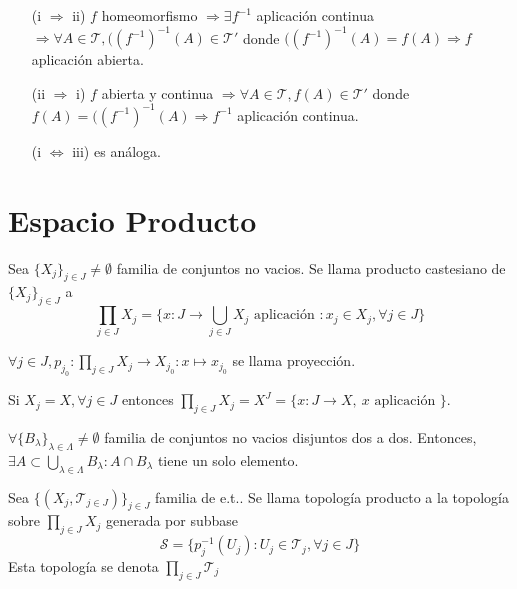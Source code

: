 \begin{dem}
  \begin{enumerate}[label=(\roman*)]
    \item []
    \item [(i $\Rightarrow$ ii)] $f$ homeomorfismo $\Rightarrow \exists f^{-1}$ aplicación continua $\Rightarrow \forall A \in \mathcal{T}, ((f^{-1})^{-1}(A) \in \mathcal{T}'$ donde $((f^{-1})^{-1}(A) = f(A) \Rightarrow f$ aplicación abierta.
    \item [(ii $\Rightarrow$ i)] $f$ abierta y continua $\Rightarrow \forall A \in \mathcal{T}, f(A) \in \mathcal{T}'$ donde $ f(A) = ((f^{-1})^{-1}(A) \Rightarrow f^{-1}$ aplicación continua.
    \item [(i $ \Leftrightarrow$ iii)] es análoga.
  \end{enumerate}

\end{dem}

\section{Espacio Producto}

\begin{defn}
  Sea $\{ X_{j} \}_{j \in J} \neq \emptyset$ familia de conjuntos no vacios. Se llama producto castesiano de $\{ X_{j} \}_{j \in J}$ a 
  \[ 
   \prod_{j \in J} X_{j} = \{ x : J \to \bigcup_{j \in J} X_{j} \text{ aplicación } : x_{j} \in X_{j}, \forall j \in J \}
  \] 
\end{defn} 

\begin{obs}
  $\forall j \in J, p_{j_{0}}: \prod_{j \in J} X_{j} \to X_{j_{0}} : x \mapsto x_{j_{0}}$ se llama proyección.
\end{obs}

\begin{obs}
  Si $X_{j} = X, \forall j \in J$ entonces $\prod_{j \in J} X_{j} = X^{J} = \{ x: J \to X, \ x \text{ aplicación } \}$.
\end{obs}

\begin{defn}
  $\forall \{ B_{\lambda} \}_{\lambda \in \Lambda} \neq \emptyset$ familia de conjuntos no vacios disjuntos dos a dos. Entonces, $ \exists A \subset \bigcup_{\lambda \in \Lambda} B_{\lambda}: A \cap B_{\lambda}$ tiene un solo elemento.
\end{defn}

\begin{defn}
  Sea $\{ ( X_{j}, \mathcal{T}_{j \in J} ) \}_{j \in J}$ familia de e.t.. Se llama topología producto a la topología sobre $\prod_{j \in J} X_{j}$ generada por subbase
  \[ 
    \mathcal{S} = \{ p_{j}^{-1}(U_{j}) : U_{j} \in \mathcal{T}_{j}, \forall j \in J \} 
  \] 
  Esta topología se denota $\prod_{j \in J} \mathcal{T}_{j}$
\end{defn}

